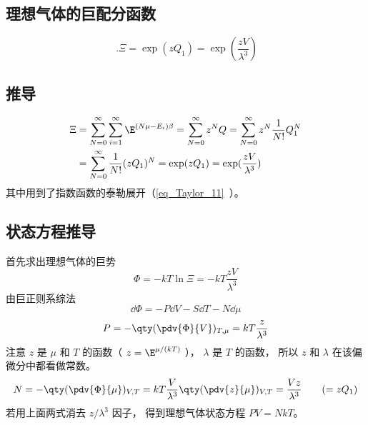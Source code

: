 
\begin{issues}
\issueDraft
\end{issues}

\subsection{理想气体的巨配分函数}
\begin{equation}\label{eq_IdMCE_1}~.
\Xi  = \exp(z Q_1) = \exp(\frac{zV}{\lambda^3})
\end{equation}
\subsection{推导}
\begin{equation}\label{eq_IdMCE_2}
\begin{aligned}
\Xi & = \sum_{N = 0}^\infty  \sum_{i = 1}^\infty  \E^{(N\mu - E_i)\beta}  = \sum_{N = 0}^\infty  z^N Q
 = \sum_{N = 0}^\infty  z^N \frac{1}{N!}Q_1^N \\
& = \sum_{N=0}^\infty  \frac{1}{N!} (z Q_1)^N
= \exp(z Q_1) = \exp(\frac{zV}{\lambda^3})
\end{aligned}
\end{equation}
其中用到了指数函数的泰勒展开（\autoref{eq_Taylor_11}~）。

\subsection{状态方程推导}
首先求出理想气体的巨势
\begin{equation}\label{eq_IdMCE_4}
\Phi  =  - kT\ln \Xi  =  - kT\frac{zV}{\lambda ^3}
\end{equation}
由巨正则系综法
\begin{equation}\label{eq_IdMCE_5}
\dd{\Phi} =  - P\dd{V} - S\dd{T} - N\dd{\mu}
\end{equation}
\begin{equation}\label{eq_IdMCE_6}
P = - \qty(\pdv{\Phi}{V})_{T, \mu} = kT\frac{z}{\lambda ^3}
\end{equation}
注意 $z$ 是 $\mu $ 和 $T$ 的函数（ $z = \E^{\mu/(kT)}$ ）， $\lambda $ 是 $T$ 的函数， 所以 $z$ 和 $\lambda $ 在该偏微分中都看做常数。
\begin{equation}\label{eq_IdMCE_7}
N = - \qty(\pdv{\Phi}{\mu})_{V,T} = kT\frac{V}{\lambda^3} \qty(\pdv{z}{\mu})_{V,T} = \frac{Vz}{\lambda ^3} 
\qquad ( = z{Q_1})
\end{equation}
若用上面两式消去 $z/\lambda^3$ 因子， 得到理想气体状态方程 $PV = NkT$。
  
